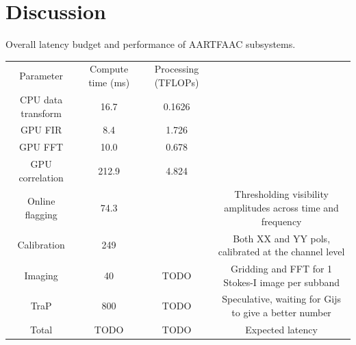 \documentclass{ws-jai}
\begin{document}
\section {\label{sec:discussion} Discussion}
\begin{wstable}[h]
\caption{Overall latency budget and performance of AARTFAAC subsystems.}
\begin{tabular}{@{}cccc@{}} \toprule
Parameter & Compute time (ms) & Processing (TFLOPs)\\ \colrule
CPU data transform & 16.7 & 0.1626  \\
GPU FIR & 8.4 & 1.726\\
GPU FFT & 10.0 & 0.678  \\
GPU correlation & 212.9 & 4.824  \\
Online flagging & 74.3 &  & Thresholding visibility amplitudes across time and frequency\\
Calibration & 249 & & Both XX and YY pols, calibrated at the channel level \\
Imaging & 40 & TODO & Gridding and FFT for 1 Stokes-I image per subband \\ 
TraP & 800 & TODO & Speculative, waiting for Gijs to give a better number\\
 \colrule
Total & TODO & TODO & Expected latency
\end{tabular}
\label{tab:afaac_latency}
\end{wstable}


\end{document}
